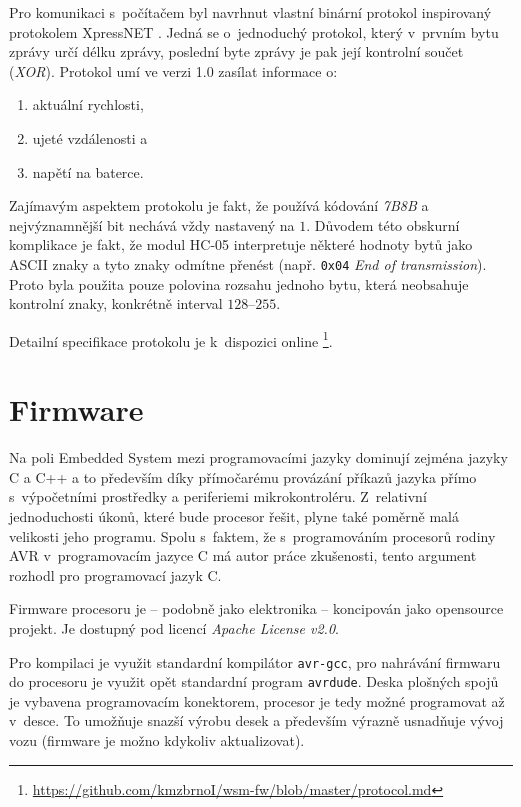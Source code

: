 Pro komunikaci s~počítačem byl navrhnut vlastní binární protokol inspirovaný
protokolem XpressNET \cite{xpressnet-specs}. Jedná se o~jednoduchý protokol, který
v~prvním bytu zprávy určí délku zprávy, poslední byte zprávy je pak její
kontrolní součet (\textit{XOR}). Protokol umí ve verzi 1.0 zasílat informace o:

\begin{enumerate}
\item aktuální rychlosti,
\item ujeté vzdálenosti a
\item napětí na baterce.
\end{enumerate}

Zajímavým aspektem protokolu je fakt, že používá kódování \textit{7B8B} a
nejvýznamnější bit nechává vždy nastavený na $1$. Důvodem této obskurní
komplikace je fakt, že modul HC-05 interpretuje některé hodnoty bytů jako
ASCII znaky a tyto znaky odmítne přenést (např. \texttt{0x04} \textit{End
of transmission}). Proto byla použita pouze polovina rozsahu jednoho
bytu, která neobsahuje kontrolní znaky, konkrétně interval $128$--$255$.

Detailní specifikace protokolu je k~dispozici online
\footnote{\url{https://github.com/kmzbrnoI/wsm-fw/blob/master/protocol.md}}.

\section{Firmware}
\label{sec:wsm-fw}

Na poli Embedded System mezi programovacími jazyky dominují zejména jazyky
C a C++ a to především díky přímočarému provázání příkazů jazyka přímo
s~výpočetními prostředky a periferiemi mikrokontroléru. Z~relativní jednoduchosti
úkonů, které bude procesor řešit, plyne také poměrně malá velikosti jeho
programu. Spolu s~faktem, že s~programováním procesorů rodiny AVR
v~programovacím jazyce C má autor práce zkušenosti, tento argument rozhodl pro
programovací jazyk C.

Firmware procesoru je -- podobně jako elektronika -- koncipován jako opensource
projekt. Je dostupný \cite{wsm-fw} pod licencí \textit{Apache License v2.0}.

Pro kompilaci je využit standardní kompilátor \texttt{avr-gcc}, pro nahrávání
firmwaru do procesoru je využit opět standardní program \texttt{avrdude}. Deska
plošných spojů je vybavena programovacím konektorem, procesor je tedy možné
programovat až v~desce. To umožňuje snazší výrobu desek a především výrazně
usnadňuje vývoj vozu (firmware je možno kdykoliv aktualizovat).

